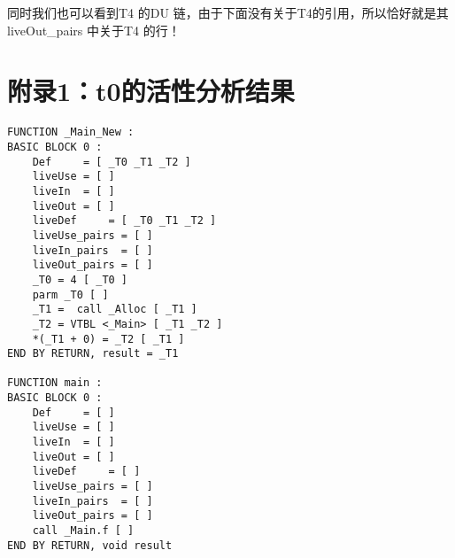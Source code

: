 \documentclass{article}
\theoremstyle{plain}
\theoremstyle{definition}
\begin{document}
    同时我们也可以看到T4 的DU 链，由于下面没有关于T4的引用，所以恰好就是其liveOut\_pairs 中关于T4 的行！

    \section{附录1：t0的活性分析结果}
    \begin{lstlisting}
FUNCTION _Main_New : 
BASIC BLOCK 0 : 
    Def     = [ _T0 _T1 _T2 ]
    liveUse = [ ]
    liveIn  = [ ]
    liveOut = [ ]
    liveDef     = [ _T0 _T1 _T2 ]
    liveUse_pairs = [ ]
    liveIn_pairs  = [ ]
    liveOut_pairs = [ ]
    _T0 = 4 [ _T0 ]
    parm _T0 [ ]
    _T1 =  call _Alloc [ _T1 ]
    _T2 = VTBL <_Main> [ _T1 _T2 ]
    *(_T1 + 0) = _T2 [ _T1 ]
END BY RETURN, result = _T1

FUNCTION main : 
BASIC BLOCK 0 : 
    Def     = [ ]
    liveUse = [ ]
    liveIn  = [ ]
    liveOut = [ ]
    liveDef     = [ ]
    liveUse_pairs = [ ]
    liveIn_pairs  = [ ]
    liveOut_pairs = [ ]
    call _Main.f [ ]
END BY RETURN, void result


\end{lstlisting}
\end{document}

